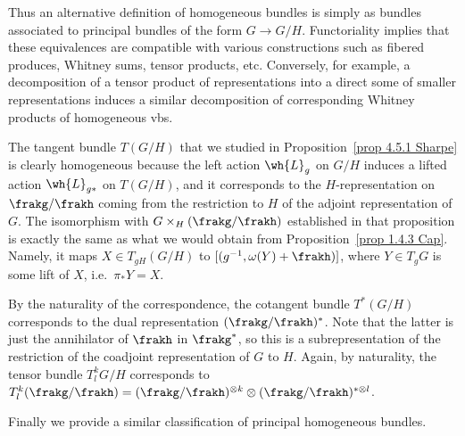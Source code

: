 Thus an alternative definition of homogeneous bundles is simply as bundles associated to principal bundles of the form $G\to G\slash H$. Functoriality implies that these equivalences are compatible with various constructions such as fibered produces, Whitney sums, tensor products, etc. Conversely, for example, a decomposition of a tensor product of representations into a direct some of smaller representations induces a similar decomposition of corresponding Whitney products of homogeneous \glspl{vb}.

\begin{example}\label{ex 1.4.3 Cap}
    The  tangent  bundle $T(G\slash H)$ that we studied in Proposition~\ref{prop 4.5.1 Sharpe} is clearly homogeneous because the left action $\wh{L}_g$ on $G\slash H$ induces a lifted action $\wh{L}_{g\ast}$ on $T(G\slash H)$, and it corresponds to the $H$-representation on $\frakg\slash \frakh$ coming from the restriction to $H$ of the adjoint representation of $G$. The isomorphism with $G\times_H (\frakg\slash\frakh)$ established in that proposition is exactly the same as what we would obtain from Proposition~\ref{prop 1.4.3 Cap}. Namely, it maps $X\in T_{gH}(G\slash H)$ to $[(g^{-1},\omega(Y)+\frakh)]$, where $Y\in T_g G$ is some lift of $X$, i.e.\ $\pi_\ast Y=X$.

    By the naturality of the correspondence, the cotangent bundle $T^\ast(G\slash H)$ corresponds to the dual representation $(\frakg\slash\frakh)^\ast$. Note that the latter is just the annihilator of $\frakh$ in $\frakg^\ast$, so this is a subrepresentation of the restriction of the coadjoint representation of $G$ to $H$. Again, by naturality, the tensor bundle $T^k_l G\slash H$ corresponds to $T^k_l(\frakg\slash\frakh)=(\frakg\slash\frakh)^{\otimes k}\otimes (\frakg\slash\frakh)^{\ast\otimes l}$.
\end{example}

Finally we provide a similar classification of principal homogeneous bundles.

